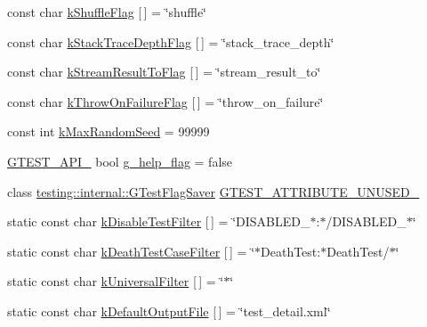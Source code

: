 \begin{DoxyCompactItemize}
\item 
const char \hyperlink{namespacetesting_1_1internal_a49a373cb8c0bc9eae2a39e8122e753cc}{k\-Shuffle\-Flag} \mbox{[}$\,$\mbox{]} = \char`\"{}shuffle\char`\"{}
\item 
const char \hyperlink{namespacetesting_1_1internal_a8dc0484b79056e6319003f4a933c7c9b}{k\-Stack\-Trace\-Depth\-Flag} \mbox{[}$\,$\mbox{]} = \char`\"{}stack\-\_\-trace\-\_\-depth\char`\"{}
\item 
const char \hyperlink{namespacetesting_1_1internal_a146c6b52bb1400ba13d45c539034af16}{k\-Stream\-Result\-To\-Flag} \mbox{[}$\,$\mbox{]} = \char`\"{}stream\-\_\-result\-\_\-to\char`\"{}
\item 
const char \hyperlink{namespacetesting_1_1internal_a2ada1f0b59f090f1791291c533c793f2}{k\-Throw\-On\-Failure\-Flag} \mbox{[}$\,$\mbox{]} = \char`\"{}throw\-\_\-on\-\_\-failure\char`\"{}
\item 
const int \hyperlink{namespacetesting_1_1internal_a19c875806aebc654557928c5df5f8ea5}{k\-Max\-Random\-Seed} = 99999
\item 
\hyperlink{gtest-port_8h_aa73be6f0ba4a7456180a94904ce17790}{\-G\-T\-E\-S\-T\-\_\-\-A\-P\-I\-\_\-} bool \hyperlink{namespacetesting_1_1internal_a05b77c93e2ac596346466a00277288ca}{g\-\_\-help\-\_\-flag} = false
\item 
class \*
\hyperlink{classtesting_1_1internal_1_1GTestFlagSaver}{testing\-::internal\-::\-G\-Test\-Flag\-Saver} \hyperlink{namespacetesting_1_1internal_a0404ab5679c87afbdd73e4161836e15a}{\-G\-T\-E\-S\-T\-\_\-\-A\-T\-T\-R\-I\-B\-U\-T\-E\-\_\-\-U\-N\-U\-S\-E\-D\-\_\-}
\item 
static const char \hyperlink{namespacetesting_a838f9d2c93a072f193aeb34809047179}{k\-Disable\-Test\-Filter} \mbox{[}$\,$\mbox{]} = \char`\"{}\-D\-I\-S\-A\-B\-L\-E\-D\-\_\-$\ast$\-:$\ast$/\-D\-I\-S\-A\-B\-L\-E\-D\-\_\-$\ast$\char`\"{}
\item 
static const char \hyperlink{namespacetesting_abece2ad88f181d37c5c8fb3e9dd0675a}{k\-Death\-Test\-Case\-Filter} \mbox{[}$\,$\mbox{]} = \char`\"{}$\ast$\-Death\-Test\-:$\ast$\-Death\-Test/$\ast$\char`\"{}
\item 
static const char \hyperlink{namespacetesting_a1bf2eaf73b98e0bc07b11550f91986a1}{k\-Universal\-Filter} \mbox{[}$\,$\mbox{]} = \char`\"{}$\ast$\char`\"{}
\item 
static const char \hyperlink{namespacetesting_a770a114e153c518bc30b271458d7591a}{k\-Default\-Output\-File} \mbox{[}$\,$\mbox{]} = \char`\"{}test\-\_\-detail.\-xml\char`\"{}
\item 

\end{DoxyCompactItemize}
